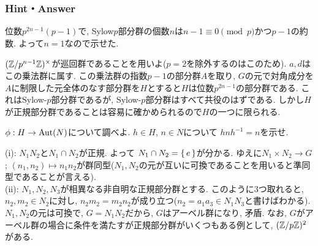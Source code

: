 \subsubsection{Hint・Answer}
{\small

\begin{probans}
\end{probans}

\begin{probans}
\end{probans}

\begin{probans}
\end{probans}

\begin{probans}
位数$p^{2n-1}(p-1)$で, Sylow$p$部分群の個数$n$は$n-1\equiv 0\pmod{p}$かつ$p-1$の約数. よって$n=1$なので示せた.

$(\mathbb{Z}/p^{n-1}\mathbb{Z})^{\times}$が巡回群であることを用いよ($p=2$を除外するのはこのため). $a,d$はこの乗法群に属す. この乗法群の指数$p-1$の部分群$A$を取り, $G$の元で対角成分を$A$に制限した元全体のなす部分群を$H$とすると$H$は位数$p^{2n-1}$の部分群である. これはSylow-$p$部分群であるが, Sylow-$p$部分群はすべて共役のはずである. しかし$H$が正規部分群であることは容易に確かめられるので$H$の一つに限られる.

\end{probans}



\begin{probans}
\end{probans}

\begin{probans}
\end{probans}

\begin{probans}
$\phi:H\to \mathrm{Aut}(N)$について調べよ. $h\in H$, $n\in N$について $hnh^{-1} = n$を示せ.
\end{probans}

\begin{probans}
(i): $N_1N_2$と$N_1\cap N_2$が正規. よって
$N_1\cap N_2 = \set{e}$が分かる. ゆえに$N_1\times N_2 \to G$; $(n_1,n_2)\mapsto n_1n_2$が群同型($N_1,N_2$の元が互いに可換であることを用いると準同型であることが言える). \\
(ii): $N_1,N_2,N_3$が相異なる非自明な正規部分群とする. このように3つ取れると, $n_2,m_2\in N_2$に対し, $n_2m_2 = m_2n_2$が成り立つ($n_2 = a_1a_3\in N_1N_3$と書けばわかる). $N_1,N_2$の元は可換で, $G=N_1N_2$だから,  $G$はアーベル群になり, 矛盾. なお, $G$がアーベル群の場合に条件を満たすが正規部分群がいくつもある例として, $(\mathbb{Z}/p\mathbb{Z})^2$がある.
\end{probans}
}






\newpage
